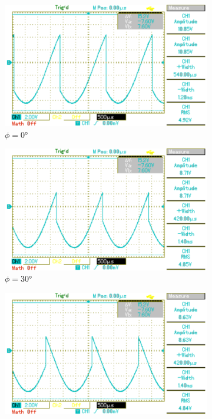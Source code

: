 \begin{figure}[p]
	\centering
	\begin{subfigure}{0.32\textwidth}
		\includegraphics[width=\textwidth]{Bilder/MAP005.pdf}
		\caption{$\phi=0°$}
	\end{subfigure}
	\begin{subfigure}{0.32\textwidth}
		\includegraphics[width=\textwidth]{Bilder/MAP006.pdf}
		\caption{$\phi=30°$}
	\end{subfigure}
	\begin{subfigure}{0.32\textwidth}
		\includegraphics[width=\textwidth]{Bilder/MAP007.pdf}

\end{subfigure}
\end{figure}
